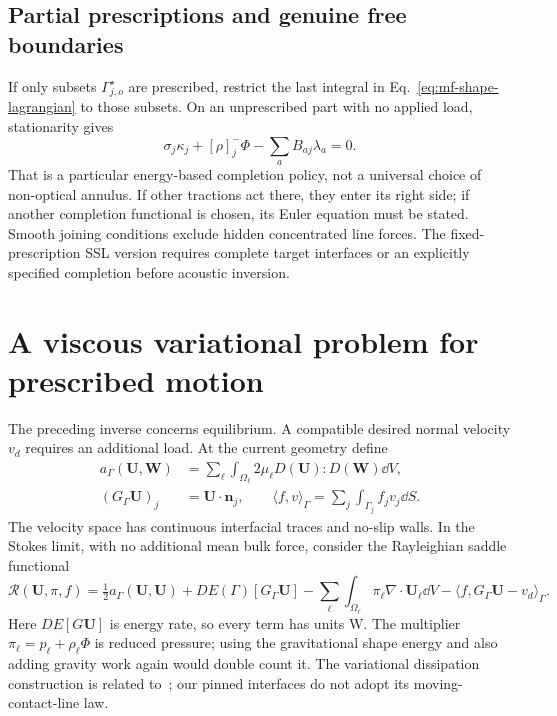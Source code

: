 \subsection{Partial prescriptions and genuine free boundaries}
If only subsets $\Gamma_{j,o}^\star$ are prescribed, restrict the last
integral in Eq.~\eqref{eq:mf-shape-lagrangian} to those subsets. On an
unprescribed part with no applied load, stationarity gives
\begin{equation}\label{eq:mf-free-completion}
 \sigma_j\kappa_j+[\rho]_j^-\Phi-\sum_aB_{aj}\lambda_a=0.
\end{equation}
That is a particular energy-based completion policy, not a universal choice
of non-optical annulus. If other tractions act there, they enter its right
side; if another completion functional is chosen, its Euler equation must
be stated. Smooth joining conditions exclude hidden concentrated line
forces. The fixed-prescription SSL version requires complete target
interfaces or an explicitly specified completion before acoustic inversion.

\section{A viscous variational problem for prescribed motion}
\label{sec:mf-viscous-inverse}
The preceding inverse concerns equilibrium. A compatible desired normal
velocity $v_d$ requires an additional load. At the current geometry define
\begin{align}
 a_\Gamma(\mathbf U,\mathbf W)&=\sum_\ell\int_{\Omega_\ell}
 2\mu_\ell D(\mathbf U):D(\mathbf W)\dd V,\label{eq:mf-viscous-form}\\
 (G_\Gamma\mathbf U)_j&=\mathbf U\cdot\mathbf n_j,\qquad
 \langle f,v\rangle_\Gamma=\sum_j\int_{\Gamma_j}f_jv_j\dd S.
\end{align}
The velocity space has continuous interfacial traces and no-slip walls.
In the Stokes limit, with no additional mean bulk force, consider the
Rayleighian saddle functional
\begin{equation}\label{eq:mf-rayleighian}
 \mathscr R(\mathbf U,\pi,f)=\tfrac12a_\Gamma(\mathbf U,\mathbf U)
 +DE(\Gamma)[G_\Gamma\mathbf U]
 -\sum_\ell\int_{\Omega_\ell}\pi_\ell\nabla\cdot\mathbf U_\ell\dd V
 -\langle f,G_\Gamma\mathbf U-v_d\rangle_\Gamma.
\end{equation}
Here $DE[G\mathbf U]$ is energy rate, so every term has units W. The
multiplier $\pi_\ell=p_\ell+\rho_\ell\Phi$ is reduced pressure;
using the gravitational shape energy and also adding gravity work again
would double count it. The variational dissipation construction is related
to~\cite{qian2006}; our pinned interfaces do not adopt its moving-contact-line
law.

